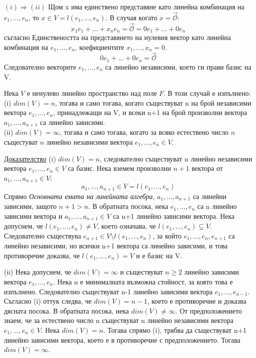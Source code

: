 \documentclass{article}
\newcommand*{\nullvec}{\vec{\mathcal{O}}}
\begin{document}
$(i)\Rightarrow(ii)$ Щом x има единствено представяне като линейна комбинация на $e_1,...,e_n$,
то $x\in V = l(e_1,...,e_n)$. В случая когато $x=\nullvec$:
\[
    x_1e_1+...+x_ne_n=\nullvec=0e_1+...+0e_n
\]
съгласно Единствеността на представянето на нулевия вектор като линейна комбинация на $e_1,...,e_n$,
коефициентите  $x_1,...,x_n=0$.
\[
    0e_1+...+0e_n=\nullvec
\]
Следователно векторите $e_1,...,e_n$ са линейно независими, което ги прави базис на V.

\begin{tcolorbox}[title = Твърдение 5.8, colframe = blue!70!black, colback = blue!10!white]
    Нека $V$ е ненулево линейно пространство над поле $F$. В този случай е изпълнено:\\
    (i) $dim(V)=n$, тогава и само тогава, когато съществуват n на брой независими вектора $e_1,...,e_n$, принадлежащи на V, и всеки
    n+1 на брой произволни вектора $a_1,...,a_{n+1}$ са линейно зависими.\\
    (ii) $dim(V)=\infty$, тогава и само тогава, когато за всяко естествено число $n$ същестуват $n$ линейно независими вектора $e_1,...,e_n\in V$.
\end{tcolorbox}

\underline{Доказателство} (i) $dim(V)=n$, следователно съществуват n линейно независими вектора $e_1,...,e_n\in V$ са базис.
Нека вземем произволни $n+1$ вектора от  $a_1,...,a_{n+1}\in V$:
\[
    a_1,...,a_{n+1}\in V=l(e_1,...,e_n)
\]
Спрямо \emph{Основната емата на линейната алгебра}, $a_1,...,a_{n+1}$ са линейни зависими, защото $n+1>n$.
В обратната посока, нека $e_1,...,e_n$ са n линейно зависими вектора и $a_1,...,a_{n+1}\in V$ са n+1 линейно зависими вектора.
Нека допуснем, че $l(e_1,...,e_n)\neq V$, което означава, че $l(e_1,...,e_n)\subsetneq V$. Следователно
съществува $e_{n+1} \in V\setminus l(e_1,...,e_n) $, за който $e_1,...,e_n,e_{n+1}$ са линейно независими, но всички n+1 вектора са линейно зависими, и това противоречие доказва, че $l(e_1,...,e_n)=V$ и е базис на V.

(ii) Нека допуснем, че  $dim(V)=\infty$ и съществуват $n \geq 2$ линейно зависими вектора $e_1,...,e_n$.
Нека n е минималната възможна стойност, за която това е изпълнено. Следователно съществуват n-1 линейно зависими вектора $e_1,...,e_{n-1}$.
Съгласно (i) оттук следва, че $dim(V)=n-1$, което е противоречие и доказва дясната посока.
В обратната посока, нека $dim(V)\neq\infty$. От предположението знаем, че за естествено число n съществуват n линейно независими вектора $e_1,...,e_n\in V$.
Нека $dim(V)=n$. Тогава спрямо (i), трябва да съществуват n+1 линейно зависими вектора, което е в противоречие с предположението. Тогава $dim(V)=\infty$.
\end{document}
